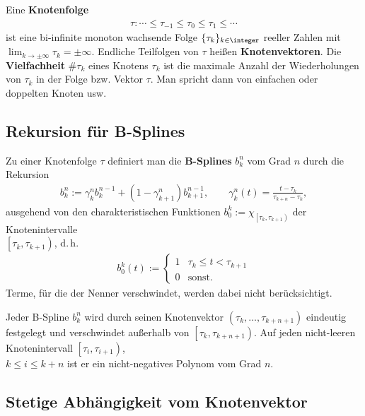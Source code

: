 Eine \textbf{Knotenfolge}
\begin{align*}
    \tau\colon \dotsb \le \tau_{-1} \le \tau_0 \le \tau_1 \le \dotsb
\end{align*}
ist eine bi-infinite monoton wachsende Folge $\{\tau_k\}_{k \in \integer}$
reeller Zahlen mit $\lim_{k \to \pm\infty} \tau_k = \pm\infty$.
Endliche Teilfolgen von $\tau$ heißen \textbf{Knotenvektoren}.
Die \textbf{Vielfachheit} $\#\tau_k$ eines Knotens $\tau_k$ ist die
maximale Anzahl der Wiederholungen von $\tau_k$ in der Folge bzw.
Vektor $\tau$.
Man spricht dann von einfachen oder doppelten Knoten usw.

\subsection{%
    Rekursion für B-Splines%
}

Zu einer Knotenfolge $\tau$ definiert man die \textbf{B-Splines} $b_k^n$
vom Grad $n$ durch die Rekursion
\begin{align*}
    b_k^n := \gamma_k^n b_k^{n-1} + (1 - \gamma_{k+1}^n)b_{k+1}^{n-1}, \qquad
    \gamma_k^n(t) = \frac{t - \tau_k}{\tau_{k+n} - \tau_k},
\end{align*}
ausgehend von den charakteristischen Funktionen
$b_0^k := \chi_{\left[\tau_k, \tau_{k+1}\right)}$ der Knotenintervalle \\
$\left[\tau_k, \tau_{k+1}\right)$, d.\,h.
\begin{align*}
    b_0^k(t) := \begin{cases}1 & \tau_k \le t < \tau_{k+1} \\
    0 & \text{sonst}.\end{cases}
\end{align*}
Terme, für die der Nenner verschwindet, werden dabei nicht berücksichtigt.

\linie

Jeder B-Spline $b_k^n$ wird durch seinen Knotenvektor
$(\tau_k, \dotsc, \tau_{k+n+1})$ eindeutig festgelegt und verschwindet
außerhalb von $\left[\tau_k, \tau_{k+n+1}\right)$.
Auf jeden nicht-leeren Knotenintervall $\left[\tau_i, \tau_{i+1}\right)$, \\
$k \le i \le k + n$ ist er ein nicht-negatives Polynom vom Grad $n$.

\subsection{%
    Stetige Abhängigkeit vom Knotenvektor%
}

